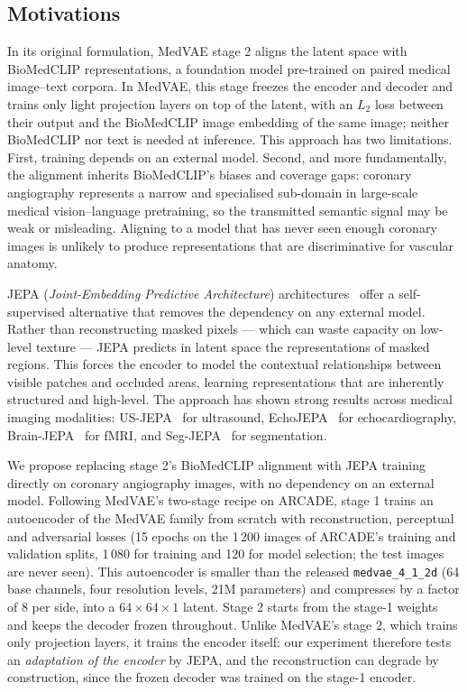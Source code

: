 \documentclass[conference]{IEEEtran}
\begin{document}
\subsection{Motivations}

In its original formulation, MedVAE stage 2 aligns the latent space with BioMedCLIP representations, a foundation model pre-trained on paired medical image--text corpora. In MedVAE, this stage freezes the encoder and decoder and trains only light projection layers on top of the latent, with an $L_2$ loss between their output and the BioMedCLIP image embedding of the same image; neither BioMedCLIP nor text is needed at inference. This approach has two limitations. First, training depends on an external model. Second, and more fundamentally, the alignment inherits BioMedCLIP's biases and coverage gaps: coronary angiography represents a narrow and specialised sub-domain in large-scale medical vision--language pretraining, so the transmitted semantic signal may be weak or misleading. Aligning to a model that has never seen enough coronary images is unlikely to produce representations that are discriminative for vascular anatomy.

JEPA (\textit{Joint-Embedding Predictive Architecture}) architectures~\cite{assran2023selfsupervisedlearningimagesjointembedding} offer a self-supervised alternative that removes the dependency on any external model. Rather than reconstructing masked pixels --- which can waste capacity on low-level texture --- JEPA predicts in latent space the representations of masked regions. This forces the encoder to model the contextual relationships between visible patches and occluded areas, learning representations that are inherently structured and high-level. The approach has shown strong results across medical imaging modalities: US-JEPA~\cite{radhachandran2026usjepajointembeddingpredictive} for ultrasound, EchoJEPA~\cite{munim2026echojepalatentpredictivefoundation} for echocardiography, Brain-JEPA~\cite{NEURIPS2024_9c3828ad} for fMRI, and Seg-JEPA~\cite{10.1007/978-981-92-0068-9_7} for segmentation.

We propose replacing stage 2's BioMedCLIP alignment with JEPA training directly on coronary angiography images, with no dependency on an external model. Following MedVAE's two-stage recipe on ARCADE, stage 1 trains an autoencoder of the MedVAE family from scratch with reconstruction, perceptual and adversarial losses (15 epochs on the 1\,200 images of ARCADE's training and validation splits, 1\,080 for training and 120 for model selection; the test images are never seen). This autoencoder is smaller than the released \texttt{medvae\_4\_1\_2d} (64 base channels, four resolution levels, 21M parameters) and compresses by a factor of 8 per side, into a $64\times64\times1$ latent. Stage 2 starts from the stage-1 weights and keeps the decoder frozen throughout. Unlike MedVAE's stage 2, which trains only projection layers, it trains the encoder itself: our experiment therefore tests an \emph{adaptation of the encoder} by JEPA, and the reconstruction can degrade by construction, since the frozen decoder was trained on the stage-1 encoder.
\end{document}
